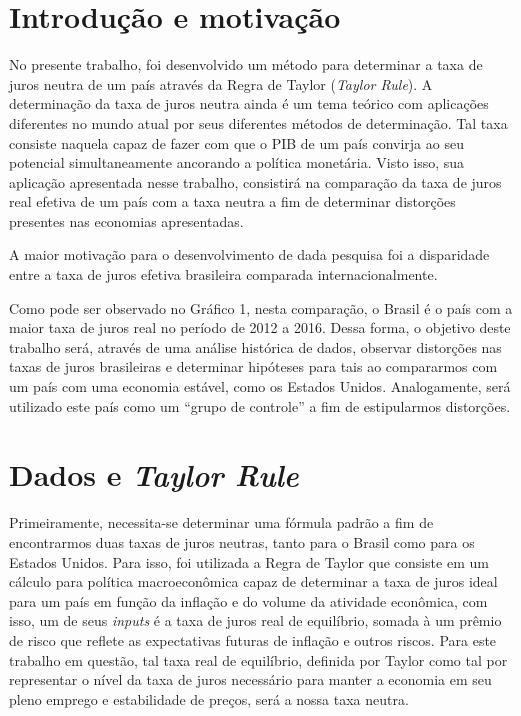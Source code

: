 \section{Introdu\c{c}\~{a}o e motiva\c{c}\~{a}o }

 No presente trabalho, foi desenvolvido um m\'{e}todo para determinar a taxa de juros neutra de um pa\'{i}s atrav\'{e}s da Regra de Taylor (\textit{Taylor Rule}). A determina\c{c}\~{a}o da taxa de juros neutra ainda \'{e} um tema te\'{o}rico com aplica\c{c}\~{o}es diferentes no mundo atual por seus diferentes m\'{e}todos de determina\c{c}\~{a}o. Tal taxa consiste naquela capaz de fazer com que o PIB de um pa\'{i}s convirja ao seu potencial simultaneamente ancorando a pol\'{i}tica monet\'{a}ria. Visto isso, sua aplica\c{c}\~{a}o apresentada nesse trabalho, consistir\'{a} na compara\c{c}\~{a}o da taxa de juros real efetiva de um pa\'{i}s com a taxa neutra a fim de determinar distor\c{c}\~{o}es presentes nas economias apresentadas.

A maior motiva\c{c}\~{a}o para o desenvolvimento de dada pesquisa foi a disparidade entre a taxa de juros efetiva brasileira comparada internacionalmente.


 Como pode ser observado no Gr\'{a}fico 1, nesta compara\c{c}\~{a}o, o Brasil \'{e} o pa\'{i}s com a maior taxa de juros real no per\'{i}odo de 2012 a 2016. Dessa forma, o objetivo deste trabalho ser\'{a}, atrav\'{e}s de uma an\'{a}lise hist\'{o}rica de dados, observar distor\c{c}\~{o}es nas taxas de juros brasileiras e determinar hip\'{o}teses para tais ao compararmos com um pa\'{i}s com uma economia est\'{a}vel, como os Estados Unidos. Analogamente, ser\'{a} utilizado este pa\'{i}s como um ``grupo de controle'' a fim de estipularmos distor\c{c}\~{o}es. 

\section{Dados e \textit{Taylor Rule} }

 Primeiramente, necessita-se determinar uma f\'{o}rmula padr\~{a}o a fim de encontrarmos duas taxas de juros neutras, tanto para o Brasil como para os Estados Unidos. Para isso, foi utilizada a Regra de Taylor que consiste em um c\'{a}lculo para pol\'{i}tica macroecon\^{o}mica capaz de determinar a taxa de juros ideal para um pa\'{i}s em fun\c{c}\~{a}o da infla\c{c}\~{a}o e do volume da atividade econ\^{o}mica, com isso, um de seus \textit{inputs} \'{e} a taxa de juros real de equil\'{i}brio, somada \`{a} um pr\^{e}mio de risco que reflete as expectativas futuras de infla\c{c}\~{a}o e outros riscos. Para este trabalho em quest\~{a}o, tal taxa real de equil\'{i}brio, definida por Taylor como tal por representar o n\'{i}vel da taxa de juros necess\'{a}rio para manter a economia em seu pleno emprego e estabilidade de pre\c{c}os, ser\'{a} a nossa taxa neutra. 

